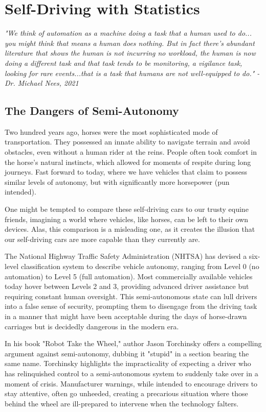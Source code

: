 \setchapterpreamble[u]{\margintoc}
\chapter{Self-Driving with Statistics}

\textit{"We think of automation as a machine doing a task that a human used to do... you might think that means a human does nothing. But in fact there's abundant literature that shows the human is not incurring no workload, the human is now doing a different task and that task tends to be monitoring, a vigilance task, looking for rare events...that is a task that humans are not well-equipped to do." - Dr. Michael Nees, 2021} \cite{nees2021}


\section{The Dangers of Semi-Autonomy}

Two hundred years ago, horses were the most sophisticated mode of transportation. They possessed an innate ability to navigate terrain and avoid obstacles, even without a human rider at the reins. People often took comfort in the horse's natural instincts, which allowed for moments of respite during long journeys. Fast forward to today, where we have vehicles that claim to possess similar levels of autonomy, but with significantly more horsepower (pun intended).

One might be tempted to compare these self-driving cars to our trusty equine friends, imagining a world where vehicles, like horses, can be left to their own devices. Alas, this comparison is a misleading one, as it creates the illusion that our self-driving cars are more capable than they currently are.

The National Highway Traffic Safety Administration (NHTSA) has devised a six-level classification system to describe vehicle autonomy, ranging from Level 0 (no automation) to Level 5 (full automation). Most commercially available vehicles today hover between Levels 2 and 3, providing advanced driver assistance but requiring constant human oversight. This semi-autonomous state can lull drivers into a false sense of security, prompting them to disengage from the driving task in a manner that might have been acceptable during the days of horse-drawn carriages but is decidedly dangerous in the modern era.

In his book "Robot Take the Wheel," author Jason Torchinsky offers a compelling argument against semi-autonomy, dubbing it "stupid" in a section bearing the same name. Torchinsky highlights the impracticality of expecting a driver who has relinquished control to a semi-autonomous system to suddenly take over in a moment of crisis. Manufacturer warnings, while intended to encourage drivers to stay attentive, often go unheeded, creating a precarious situation where those behind the wheel are ill-prepared to intervene when the technology falters.\cite{torchinskyboeckmann2019}

